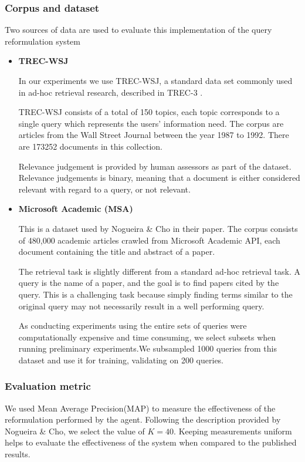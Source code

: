 \subsubsection{Corpus and dataset}

Two sources of data are used to evaluate this implementation of the query reformulation system

\begin{itemize}
	\item \textbf{TREC-WSJ} 
	
	In our experiments we use TREC-WSJ, a standard data set commonly used in ad-hoc retrieval research, described in TREC-3 \cite{harman1995overview}. 
	
	TREC-WSJ  consists of a total of 150 topics, each topic corresponds to a single query which represents the users' information need. The corpus are articles from the Wall Street Journal between the year 1987 to 1992. There are 173252 documents in this collection.
	
	Relevance judgement is provided by human assessors as part of the dataset. Relevance judgements is binary, meaning that a document is either considered relevant with regard to a query, or not relevant.
	
	
	\item \textbf{Microsoft Academic (MSA)}
	
	This is a dataset used by Nogueira \& Cho \cite{nogueira2017task} in their paper. The corpus consists of 480,000 academic articles crawled from Microsoft Academic API, each document containing the title and abstract of a paper.
	
	The retrieval task is slightly different from a standard ad-hoc retrieval task. A query is the name of a paper, and the goal is to find papers cited by the query. This is a challenging task because simply finding terms similar to the original query may not necessarily result in a well performing query.  
	
	As conducting experiments using the entire sets of queries were computationally expensive and time consuming, we select subsets when running preliminary experiments.We subsampled 1000 queries from this dataset and use it for training, validating on 200 queries. 
\end{itemize}


\subsubsection{Evaluation metric}
We used Mean Average Precision(MAP) to measure the effectiveness of the reformulation performed by the agent. Following the description provided by Nogueira \& Cho\cite{nogueira2017task}, we select the value of $K=40$. Keeping measurements uniform helps to evaluate the effectiveness of the system when compared to the published results. 

